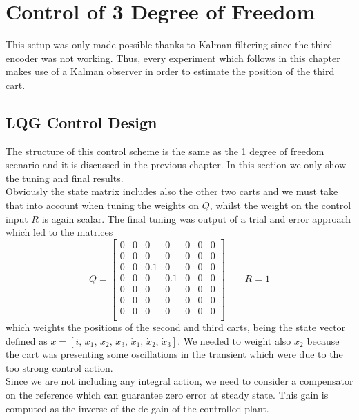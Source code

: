 {\let\clearpage\relax \chapter{Control of 3 Degree of Freedom}}
	This setup was only made possible thanks to Kalman filtering since the third encoder was not working. Thus, every experiment which follows in this chapter makes use of a Kalman observer in order to estimate the position of the third cart.
\section{LQG Control Design}

The structure of this control scheme is the same as the 1 degree of freedom scenario and it is discussed in the previous chapter. In this section we only show the tuning and final results.\\

Obviously the state matrix includes also the other two carts and we must take that into account when tuning the weights on $Q$, whilst the weight on the control input $R$ is again scalar. The final tuning was output of a trial and error approach which led to the matrices
\begin{equation}
\renewcommand{\arraystretch}{1}
Q = 
\begin{bmatrix}
0 & 0 & 0 & 0 & 0 & 0 & 0\\
0 & 0 & 0 & 0 & 0 & 0 & 0\\
0 & 0 & 0.1 & 0 & 0 & 0 & 0\\
0 & 0 & 0 & 0.1 & 0 & 0 & 0\\
0 & 0 & 0 & 0 & 0 & 0 & 0\\
0 & 0 & 0 & 0 & 0 & 0 & 0\\
0 & 0 & 0 & 0 & 0 & 0 & 0\\
\end{bmatrix}
\qquad
R=1
\end{equation}
which weights the positions of the second and third carts, being the state vector defined as $x = \left[ i,\, x_1,\, x_2,\, x_3,\, \dot{x}_1,\, \dot{x}_2,\, \dot{x}_3 \right] $. We needed to weight also $x_2$ because the cart was presenting some oscillations in the transient which were due to the too strong control action.\\

Since we are not including any integral action, we need to consider a compensator on the reference which can guarantee zero error at steady state. This gain is computed as the inverse of the dc gain of the controlled plant.

